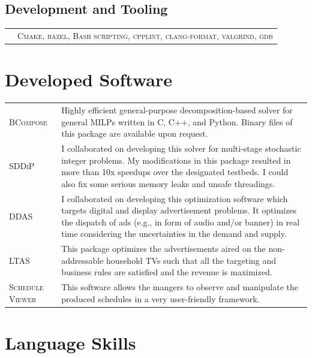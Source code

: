 \documentclass[10PT,letter]{article}
\newcommand{\subsectionstyle}[1]{\normalfont\selectfont\textcolor{titlecol}{\sffamily #1}}
\newcommand{\numbox}[1]{} %
\begin{document}
        \subsection*{\subsectionstyle{Development and Tooling}}
        		\begin{tabular}{p{.2in}p{5.55in}}
        			& 	\textsc{Cmake, bazel, Bash scripting,  cpplint, clang-format, valgrind, gdb} 
        		\end{tabular}


\section*{\numbox{9}\bfseries\textcolor{titlecol}{\sffamily Developed Software}}
			\begin{tabular}{p{1.2in}p{5.55in}}
				\textsc{BCompose} &  
												Highly efficient general-purpose decomposition-based solver for general MILPs written in C, C++, and Python. Binary files of this package are available upon request.\\[.5mm]
				\textsc{SDDiP} & 
												I collaborated on developing  this solver for multi-stage stochastic integer problems. My modifications in this package resulted in more than 10x speedups  over the designated testbeds.  I could also fix some serious memory leaks and unsafe threadings. \\[.5mm]
				\textsc{DDAS} & 
												I collaborated on developing this optimization software which targets  digital and display advertisement problems. It optimizes the dispatch of ads (e.g., in form of audio and/or banner)  in real time considering the uncertainties in the demand and supply. \\[.5mm]
				\textsc{LTAS} & 
												This package optimizes the advertisements aired on the non-addressable household TVs such that all the targeting and business rules    are satisfied and the revenue is maximized. \\[.5mm]
				\textsc{Schedule Viewer} & 
												This software allows the mangers to observe and manipulate the produced schedules in a very user-friendly framework.  \\[.5mm]
			\end{tabular}

\section*{\numbox{9}\bfseries\textcolor{titlecol}{\sffamily Language Skills}}
\end{document}
